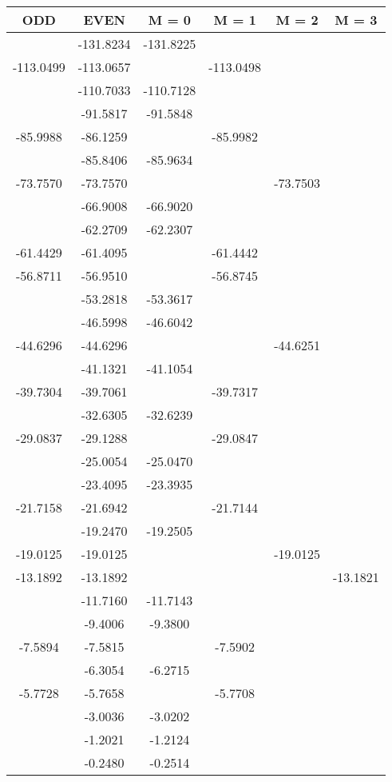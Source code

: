 \documentclass[12pt]{article}
\begin{document}
\begin{table}[H]
\begin{center}
\begin{tabular}{cccccc}
\toprule[1.5pt]
ODD & EVEN & M = 0 & M = 1 & M = 2 & M = 3\\ 
\midrule
& -131.8234 & -131.8225 & & & \\ 
-113.0499 & -113.0657 & & -113.0498 & & \\ 
& -110.7033 & -110.7128 & & & \\ 
& -91.5817 & -91.5848 & & & \\ 
-85.9988 & -86.1259 & & -85.9982 & & \\ 
& -85.8406 & -85.9634 & & & \\ 
-73.7570 & -73.7570 & & & -73.7503 & \\ 
& -66.9008 & -66.9020 & & & \\ 
& -62.2709 & -62.2307 & & & \\ 
-61.4429 & -61.4095 & & -61.4442 & & \\ 
-56.8711 & -56.9510 & & -56.8745 & & \\ 
& -53.2818 & -53.3617 & & & \\ 
& -46.5998 & -46.6042 & & & \\ 
-44.6296 & -44.6296 & & & -44.6251 & \\ 
& -41.1321 & -41.1054 & & & \\ 
-39.7304 & -39.7061 & & -39.7317 & & \\ 
& -32.6305 & -32.6239 & & & \\ 
-29.0837 & -29.1288 & & -29.0847 & & \\ 
& -25.0054 & -25.0470 & & & \\ 
& -23.4095 & -23.3935 & & & \\ 
-21.7158 & -21.6942 & & -21.7144 & & \\ 
& -19.2470 & -19.2505 & & & \\ 
-19.0125 & -19.0125 & & & -19.0125 & \\ 
-13.1892 & -13.1892 & & & & -13.1821\\ 
& -11.7160 & -11.7143 & & & \\ 
& -9.4006 & -9.3800 & & & \\ 
-7.5894 & -7.5815 & & -7.5902 & & \\ 
& -6.3054 & -6.2715 & & & \\ 
-5.7728 & -5.7658 & & -5.7708 & & \\ 
& -3.0036 & -3.0202 & & & \\ 
& -1.2021 & -1.2124 & & & \\ 
& -0.2480 & -0.2514 & & & \\ 
\bottomrule
\end{tabular}
\end{center}
\end{table}
\end{document}
